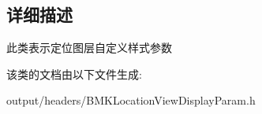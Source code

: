 \subsection{详细描述}
此类表示定位图层自定义样式参数 

该类的文档由以下文件生成\+:\begin{DoxyCompactItemize}
\item 
output/headers/B\+M\+K\+Location\+View\+Display\+Param.\+h\end{DoxyCompactItemize}
